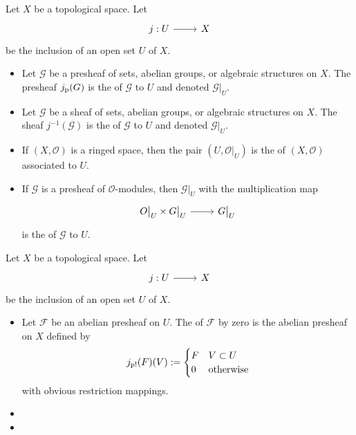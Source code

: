 \documentclass [11 pt, oneside] {article}
\begin{document}
\begin{definition}\label{}\text{}
Let $X$ be a topological space. Let
\[
\begin{tikzcd}
	j:U\ar[r]& X
\end{tikzcd}
\]
be the inclusion of an open set $U$ of $X$.
\begin{itemize}
	\item Let $\mathscr{G}$ be a presheaf of sets, abelian groups, or algebraic structures on $X$. The presheaf $j_{\textup {p}}(\relax{G})$ is the  of $\mathscr{G}$ to $U$ and denoted $\mathscr{G}\big|_{U}$.
	\item Let $\mathscr{G}$ be a sheaf of sets, abelian groups, or algebraic structures on $X$. The sheaf $j^{-1}(\mathscr{G})$ is the  of $\mathscr{G}$ to $U$ and denoted $\mathscr{G}\big|_{U}$.
	\item If $(X,\mathscr{O})$ is a ringed space, then the pair $(U, \mathscr{O}\big|_{U})$ is the  of $(X,\mathscr{O})$ associated to $U$.
	\item If $\mathscr{G}$ is a presheaf of $\mathscr{O}$-modules, then $\mathscr{G}\big|_{U}$ with the multiplication map
		\[
		\begin{tikzcd}
			\mathscr{O}\big|_{U}\times \mathscr{G}\big|_{U}\ar[r]&\mathscr{G}\big|_{U}
		\end{tikzcd}
		\]
		is the  of $\mathscr{G}$ to $U$.
\end{itemize}
\end{definition}

\begin{definition}\label{}\text{}
Let $X$ be a topological space. Let
\[
\begin{tikzcd}
	j:U\ar[r]& X
\end{tikzcd}
\]
be the inclusion of an open set $U$ of $X$.
\begin{itemize}
	\item Let $\mathscr{F}$ be an abelian presheaf on $U$. The  of $\mathscr{F}$ by zero is the abelian presheaf on $X$ defined by
		\begin{align*}
			j_{\textup {p!}}(\relax{F}) (V) :=
			 \begin{cases}
				 \relax{F} & V\subset U\\
				 0&\textrm{otherwise}
			\end{cases}
		\end{align*}
		with obvious restriction mappings. 
	\item 
	\item 
\end{itemize}

\end{definition}
\end{document}

